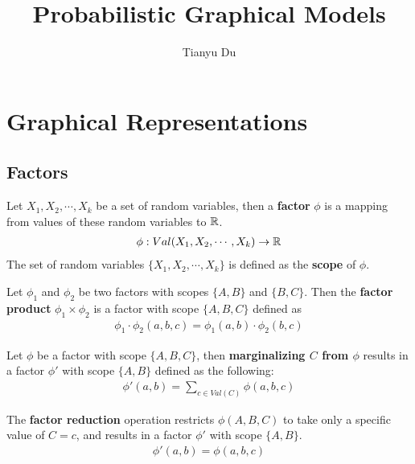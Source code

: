 \documentclass[11pt]{article}
\title{Probabilistic Graphical Models}
\author{Tianyu Du}
\begin{document}
	\maketitle
	\section{Graphical Representations}
	\subsection{Factors}
	\begin{definition}
		Let $X_1, X_2, \cdots, X_k$ be a set of random variables, then a \textbf{factor} $\phi$ is a mapping from values of these random variables to $\mathbb{R}$.
		\begin{align}
			\phi: Val(X_1, X_2, \cdots, X_k) \to \mathbb{R}
		\end{align}
		The set of random variables $\{X_1, X_2, \cdots, X_k\}$ is defined as the \textbf{scope} of $\phi$.
	\end{definition}
	
	\begin{definition}
		Let $\phi_1$ and $\phi_2$ be two factors with scopes $\{A,B\}$ and $\{B, C\}$.
		Then the \textbf{factor product} $\phi_1 \times \phi_2$ is a factor with scope $\{A, B, C\}$ defined as
		\begin{align}
			\phi_1 \cdot \phi_2 (a, b, c) = \phi_1(a, b) \cdot \phi_2(b, c)
		\end{align}
	\end{definition}
	
	\begin{definition}
		Let $\phi$ be a factor with scope $\{A, B, C\}$, then \textbf{marginalizing $C$ from $\phi$} results in a factor $\phi'$ with scope $\{A, B\}$ defined as the following:
		\begin{align}
			\phi'(a, b) = \sum_{c \in Val(C)} \phi(a, b, c)
		\end{align}
	\end{definition}
	
	\begin{definition}
		The \textbf{factor reduction} operation restricts $\phi(A,B,C)$ to take only a specific value of $C=c$, and results in a factor $\phi'$ with scope $\{A, B\}$.
		\begin{align}
			\phi'(a, b) = \phi(a, b, c)
		\end{align}
	\end{definition}
	
\end{document}
